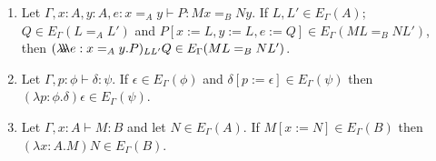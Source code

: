 \begin{lemma}
\label{lm:wte}
$ $
\begin{enumerate}
\item
\label{lm:wteE}
Let $\Gamma, x : A, y : A, e : x =_A y \vdash P : M x =_B N y$.  If
$L, L' \in E_\Gamma(A)$; $Q \in E_\Gamma(L =_A L')$ and $P[ x := L, y := L, e
:= Q ] \in E_\Gamma(M L =_B N L')$, then $(\lambda \!\! \lambda \!\! \lambda e : x =_A y . P)_{L L'} Q \in E_\Gamma(ML =_B NL')$.
\item
\label{lm:wteP}
Let $\Gamma, p : \phi \vdash \delta : \psi$.  If $\epsilon \in E_\Gamma(\phi)$
and $\delta [p := \epsilon] \in E_\Gamma(\psi)$ then $(\lambda p:\phi.\delta) \epsilon \in E_\Gamma(\psi)$.
\item
\label{lm:wteT}
Let $\Gamma, x : A \vdash M : B$ and let $N \in E_\Gamma(A)$. If $M[x:=N] \in E_\Gamma(B)$ then $(\lambda x:A.M)N \in E_\Gamma(B)$.
\end{enumerate}
\end{lemma}

